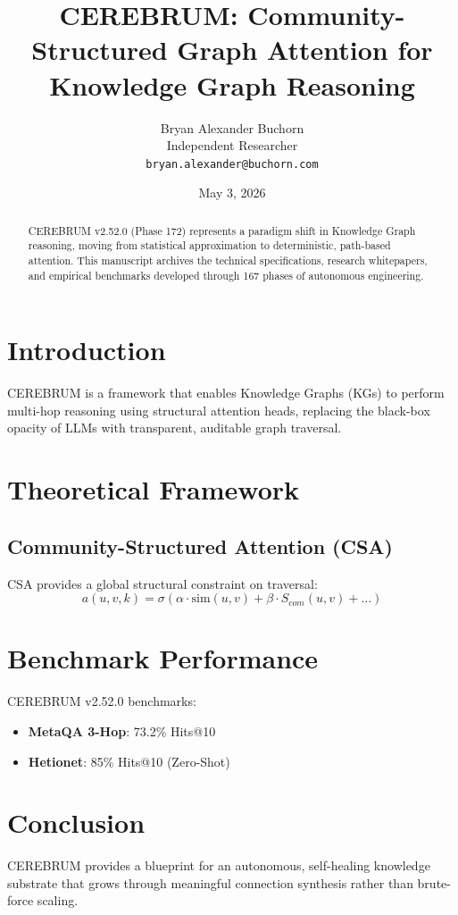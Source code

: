 ﻿\documentclass[11pt,a4paper]{article}
\title{CEREBRUM: Community-Structured Graph Attention for Knowledge Graph Reasoning}
\author{Bryan Alexander Buchorn \\ Independent Researcher \\ \texttt{bryan.alexander@buchorn.com}}
\date{May 3, 2026}
\begin{document}
\maketitle

\begin{abstract}
CEREBRUM v2.52.0 (Phase 172) represents a paradigm shift in Knowledge Graph reasoning, moving from statistical approximation to deterministic, path-based attention. This manuscript archives the technical specifications, research whitepapers, and empirical benchmarks developed through 167 phases of autonomous engineering.
\end{abstract}

\section{Introduction}
CEREBRUM is a framework that enables Knowledge Graphs (KGs) to perform multi-hop reasoning using structural attention heads, replacing the black-box opacity of LLMs with transparent, auditable graph traversal.

\section{Theoretical Framework}
\subsection{Community-Structured Attention (CSA)}
CSA provides a global structural constraint on traversal:
\begin{equation}
a(u,v,k) = \sigma( \alpha \cdot \text{sim}(u,v) + \beta \cdot S_{com}(u,v) + \dots )
\end{equation}

\section{Benchmark Performance}
CEREBRUM v2.52.0 benchmarks:
\begin{itemize}
    \item \textbf{MetaQA 3-Hop}: 73.2\% Hits@10
    \item \textbf{Hetionet}: 85\% Hits@10 (Zero-Shot)
\end{itemize}

\section{Conclusion}
CEREBRUM provides a blueprint for an autonomous, self-healing knowledge substrate that grows through meaningful connection synthesis rather than brute-force scaling.
\end{document}

